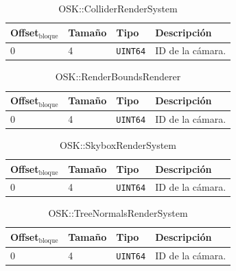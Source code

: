 \documentclass[12pt,a4paper]{article}
\begin{document}
\begin{table}[h]
\caption{OSK::ColliderRenderSystem}
\center
\begin{tabular}{llll}
\hline
Offset$_\text{bloque}$ & Tamaño & Tipo & Descripción \\ \hline
0 & 4 & \texttt{UINT64} & ID de la cámara. \\
\hline
\end{tabular}
\end{table}

\begin{table}[h]
\caption{OSK::RenderBoundsRenderer}
\center
\begin{tabular}{llll}
\hline
Offset$_\text{bloque}$ & Tamaño & Tipo & Descripción \\ \hline
0 & 4 & \texttt{UINT64} & ID de la cámara. \\
\hline
\end{tabular}
\end{table}

\begin{table}[h]
\caption{OSK::SkyboxRenderSystem}
\center
\begin{tabular}{llll}
\hline
Offset$_\text{bloque}$ & Tamaño & Tipo & Descripción \\ \hline
0 & 4 & \texttt{UINT64} & ID de la cámara. \\
\hline
\end{tabular}
\end{table}

\begin{table}[h]
\caption{OSK::TreeNormalsRenderSystem}
\center
\begin{tabular}{llll}
\hline
Offset$_\text{bloque}$ & Tamaño & Tipo & Descripción \\ \hline
0 & 4 & \texttt{UINT64} & ID de la cámara. \\
\hline
\end{tabular}
\end{table}
\end{document}
